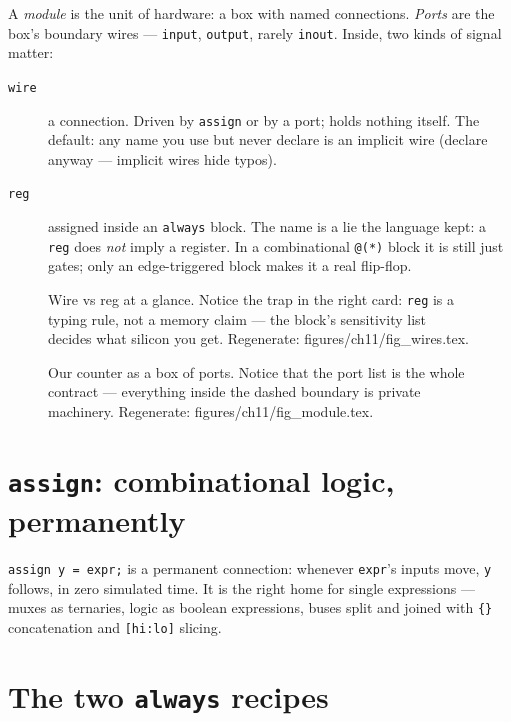 A \emph{module} is the unit of hardware: a box
with named connections. \emph{Ports} are the box's
boundary wires --- \texttt{input}, \texttt{output}, rarely
\texttt{inout}. Inside, two kinds of signal matter:

\begin{description}
\item[\texttt{wire}] a connection. Driven by \texttt{assign} or by a
port; holds nothing itself. The default: any name you use but never
declare is an implicit wire (declare anyway --- implicit wires hide
typos).
\item[\texttt{reg}] assigned inside an \texttt{always} block. The name
is a lie the language kept: a \texttt{reg} does \emph{not} imply a
register. In a combinational \texttt{@(*)} block it is still just
gates; only an edge-triggered block makes it a real flip-flop.
\end{description}

\begin{figure}[htbp]
\centering

\caption{Wire vs reg at a glance. Notice the trap in the right card:
\texttt{reg} is a typing rule, not a memory claim --- the block's
sensitivity list decides what silicon you get. Regenerate:
\ttfamily figures/ch11/fig\_wires.tex.}
\label{fig:wires}
\end{figure}

\begin{figure}[htbp]
\centering

\caption{Our counter as a box of ports. Notice that the port list is the
whole contract --- everything inside the dashed boundary is private
machinery. Regenerate: \ttfamily figures/ch11/fig\_module.tex.}
\label{fig:module11}
\end{figure}

\section{\texttt{assign}: combinational logic, permanently}
\label{sec:assign}

\texttt{assign y = expr;} is a permanent connection: whenever \texttt{expr}'s inputs move, \texttt{y} follows,
in zero simulated time. It is the right home for single expressions
--- muxes as ternaries, logic as boolean expressions, buses split and
joined with \texttt{\{\}} concatenation and \texttt{[hi:lo]} slicing.

\section{The two \texttt{always} recipes}\label{sec:always}

